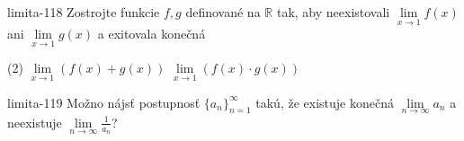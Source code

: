 \begin{defproblem}{limita-118}
Zostrojte funkcie $f,g$ definované na $\mathbb{R}$ tak, aby neexistovali
$\lim\limits_{x \to 1} f(x)$ ani $\lim\limits_{x \to 1} g(x)$ a exitovala
konečná
\begin{tasks}(2)
    \task $\lim\limits_{{x \to 1}} (f(x)+g(x))$
    \task $\lim\limits_{{x \to 1}} (f(x) \cdot g(x))$
\end{tasks}
\end{defproblem}

\begin{defproblem}{limita-119}
Možno nájsť postupnosť ${\{a_n\}}_{n=1}^\infty$ takú, že existuje konečná
$\lim\limits_{n \to \infty} a_n$ a neexistuje $\lim\limits_{n \to \infty}
\frac{1}{a_n}$?
\end{defproblem}

